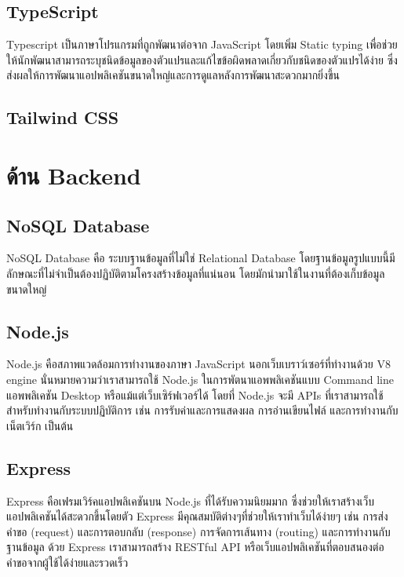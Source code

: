 \subsection{TypeScript}
Typescript เป็นภาษาโปรแกรมที่ถูกพัฒนาต่อจาก JavaScript โดยเพิ่ม Static typing เพื่อช่วยให้นักพัฒนาสามารถระบุชนิดข้อมูลของตัวแปรและแก้ไขข้อผิดพลาดเกี่ยวกับชนิดของตัวแปรได้ง่าย ซึ่งส่งผลให้การพัฒนาแอปพลิเคชันขนาดใหญ่และการดูแลหลังการพัฒนาสะดวกมากยิ่งขึ้น \cite{typescript}
\subsection{Tailwind CSS}

\section{ด้าน Backend}
\subsection{NoSQL Database}
NoSQL Database คือ ระบบฐานข้อมูลที่ไม่ใช่ Relational Database โดยฐานข้อมูลรูปแบบนี้มีลักษณะที่ไม่จำเป็นต้องปฏิบัติตามโครงสร้างข้อมูลที่แน่นอน โดยมักนำมาใช้ในงานที่ต้องเก็บข้อมูลขนาดใหญ่
\cite{nosql}
\subsection{Node.js}
Node.js คือสภาพแวดล้อมการทำงานของภาษา JavaScript นอกเว็บเบราว์เซอร์ที่ทำงานด้วย V8 engine นั่นหมายความว่าเราสามารถใช้ Node.js ในการพัตนาแอพพลิเคชันแบบ Command line แอพพลิเคชัน Desktop หรือแม้แต่เว็บเซิร์ฟเวอร์ได้ โดยที่ Node.js จะมี APIs ที่เราสามารถใช้สำหรับทำงานกับระบบปฏิบัติการ เช่น การรับค่าและการแสดงผล การอ่านเขียนไฟล์ และการทำงานกับเน็ตเวิร์ก เป็นต้น
\cite{node}
\subsection{Express}
Express คือเฟรมเวิร์คแอปพลิเคชันบน Node.js ที่ได้รับความนิยมมาก ซึ่งช่วยให้เราสร้างเว็บแอปพลิเคชันได้สะดวกขึ้นโดยตัว Express มีคุณสมบัติต่างๆที่ช่วยให้เราทำเว็บได้ง่ายๆ เช่น การส่งคำขอ (request) และการตอบกลับ (response) การจัดการเส้นทาง (routing) และการทำงานกับฐานข้อมูล ด้วย Express เราสามารถสร้าง RESTful API หรือเว็บแอปพลิเคชันที่ตอบสนองต่อคำขอจากผู้ใช้ได้ง่ายและรวดเร็ว
\cite{express}
